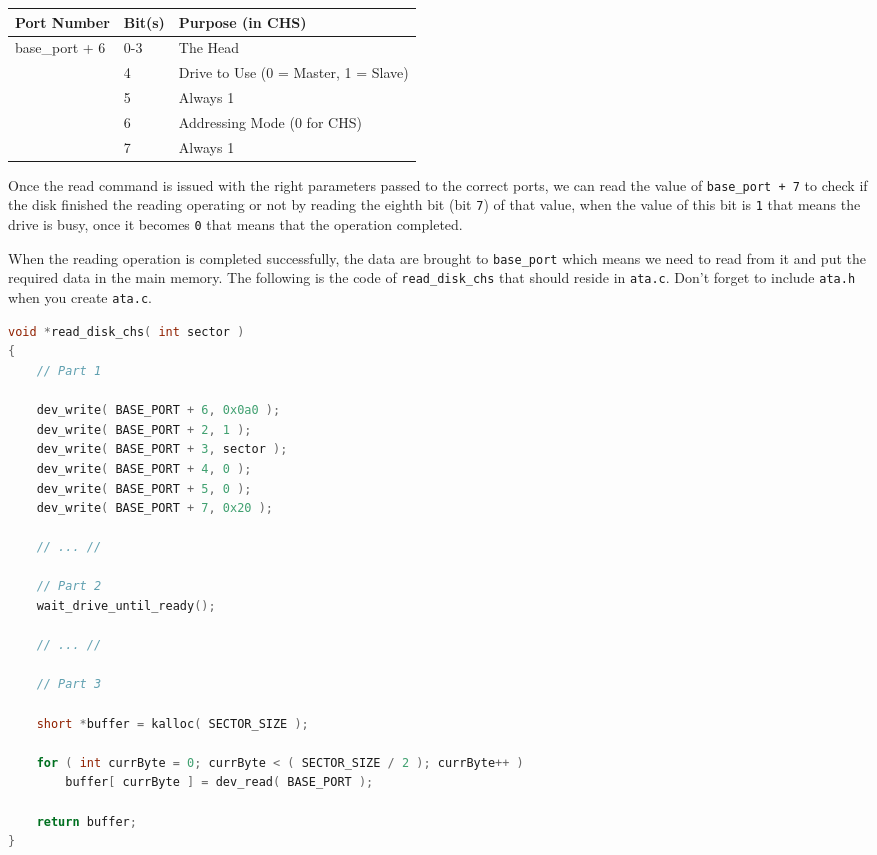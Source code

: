 \begin{longtable}[]{@{}lll@{}}
\toprule
Port Number & Bit(s) & Purpose (in CHS)\tabularnewline
\midrule
\endhead
base\_port + 6 & 0-3 & The Head\tabularnewline
& 4 & Drive to Use (0 = Master, 1 = Slave)\tabularnewline
& 5 & Always 1\tabularnewline
& 6 & Addressing Mode (0 for CHS)\tabularnewline
& 7 & Always 1\tabularnewline
\bottomrule
\end{longtable}

Once the read command is issued with the right parameters passed to the
correct ports, we can read the value of \lstinline!base_port + 7! to
check if the disk finished the reading operating or not by reading the
eighth bit (bit \lstinline!7!) of that value, when the value of this bit
is \lstinline!1! that means the drive is busy, once it becomes
\lstinline!0! that means that the operation completed.

When the reading operation is completed successfully, the data are
brought to \lstinline!base_port! which means we need to read from it and
put the required data in the main memory. The following is the code of
\lstinline!read_disk_chs! that should reside in \lstinline!ata.c!. Don't
forget to include \lstinline!ata.h! when you create \lstinline!ata.c!.

\begin{lstlisting}[language=C]
void *read_disk_chs( int sector )
{
    // Part 1
    
    dev_write( BASE_PORT + 6, 0x0a0 );
    dev_write( BASE_PORT + 2, 1 );
    dev_write( BASE_PORT + 3, sector );
    dev_write( BASE_PORT + 4, 0 );
    dev_write( BASE_PORT + 5, 0 );
    dev_write( BASE_PORT + 7, 0x20 );
    
    // ... //
    
    // Part 2
    wait_drive_until_ready();
    
    // ... //
    
    // Part 3
    
    short *buffer = kalloc( SECTOR_SIZE );
    
    for ( int currByte = 0; currByte < ( SECTOR_SIZE / 2 ); currByte++ )
        buffer[ currByte ] = dev_read( BASE_PORT );

    return buffer;
}
\end{lstlisting}

